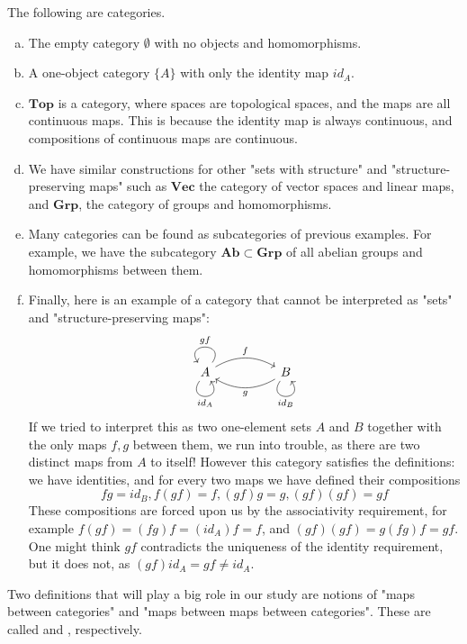 \begin{example}
The following are categories.
\begin{enumerate}[(a)]

\item The empty category $\emptyset$ with no objects and homomorphisms.
\item A one-object category $\{A\}$ with only the identity map $id_A$.

\item $\mathbf{Top}$ is a category, where spaces are topological spaces, and the maps are all continuous maps. This is because the identity map is always continuous, and compositions of continuous maps are continuous.

\item We have similar constructions for other "sets with structure" and "structure-preserving maps" such as $\mathbf{Vec}$ the category of vector spaces and linear maps, and $\mathbf{Grp}$, the category of groups and homomorphisms.
\item Many categories can be found as subcategories of previous examples. For example, we have the subcategory $\mathbf{Ab}\subset \mathbf{Grp}$ of all abelian groups and homomorphisms between them.
\item Finally, here is an example of a category that cannot be interpreted as "sets" and "structure-preserving maps": 
\[\begin{tikzcd}
A \arrow["id_A"', loop, distance=2em, in=305, out=235] \arrow[rr, "f", bend left] \arrow["gf"', loop, distance=2em, in=125, out=55] &  & B \arrow["id_B"', loop, distance=2em, in=305, out=235] \arrow[ll, "g", bend left]
\end{tikzcd}\]
If we tried to interpret this as two one-element sets $A$ and $B$ together with the only maps $f,g$ between them, we run into trouble, as there are two distinct maps from $A$ to itself! However this category satisfies the definitions: we have identities, and for every two maps we have defined their compositions
$$fg=id_B, f(gf)=f,(gf)g=g,(gf)(gf)=gf$$
These compositions are forced upon us by the associativity requirement, for example $f(gf)=(fg)f=(id_A)f=f$, and $(gf)(gf)=g(fg)f=gf$. One might think $gf$ contradicts the uniqueness of the identity requirement, but it does not, as $(gf)id_A=gf\neq id_A$. 

\end{enumerate}\end{example}
\par Two definitions that will play a big role in our study are notions of "maps between categories" and "maps between maps between categories". These are called  and , respectively.

